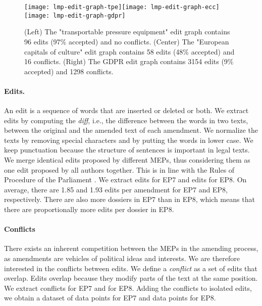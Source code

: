\begin{figure*}
	\newcommand{\imgscale}{0.88}
	\texttt{[image: lmp-edit-graph-tpe]}\hfill\texttt{[image: lmp-edit-graph-ecc]}\hfill\texttt{[image: lmp-edit-graph-gdpr]}
	\caption{
		(Left) The "transportable pressure equipment" edit graph contains 96 edits (97\% accepted) and no conflicts.
		(Center) The "European capitals of culture" edit graph contains 58 edits (48\% accepted) and 16 conflicts.
		(Right) The GDPR edit graph contains 3154 edits (9\% accepted) and 1298 conflicts.
	}
	\label{fig:edit_graph}
\end{figure*}

\paragraph{Edits.}
An edit is a sequence of words that are inserted or deleted or both.
We extract edits by computing the \textit{diff}, i.e., the difference between the words in two texts, between the original and the amended text of each amendment.
We normalize the texts by removing special characters and by putting the words in lower case.
We keep punctuation because the structure of sentences is important in legal texts.
We merge identical edits proposed by different MEPs, thus considering them as one edit proposed by all authors together.
This is in line with the Rules of Procedure of the Parliament \cite{europarl2018rules}.
We extract  edits for EP7 and  edits for EP8.
On average, there are 1.85 and 1.93 edits per amendment for EP7 and EP8, respectively.
There are also more dossiers in EP7 than in EP8, which means that there are proportionally more edits per dossier in EP8.

\paragraph{Conflicts}
There exists an inherent competition between the MEPs in the amending process, as amendments are vehicles of political ideas and interests.
We are therefore interested in the conflicts between edits.
We define a \textit{conflict} as a set of edits that overlap.
Edits overlap because they modify parts of the text at the same position.
We extract  conflicts for EP7 and  for EP8.
Adding the conflicts to isolated edits, we obtain a dataset of  data points for EP7 and  data points for EP8.

